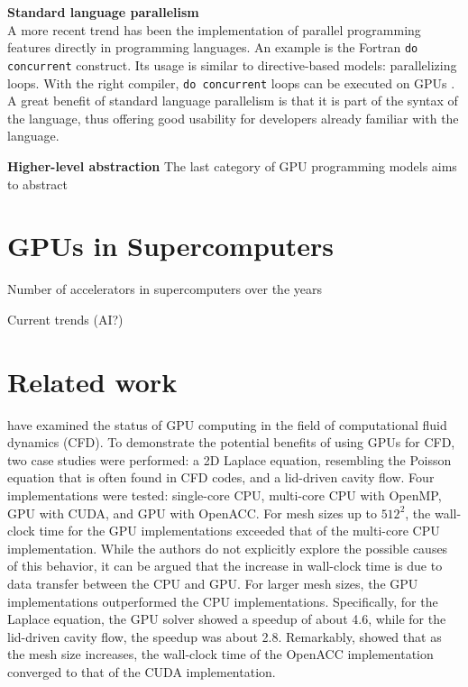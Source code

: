 \textbf{Standard language parallelism} \\
A more recent trend has been the implementation of parallel programming features directly in programming languages. An example is the Fortran \texttt{do concurrent} construct. Its usage is similar to directive-based models: parallelizing loops. With the right compiler, \texttt{do concurrent} loops can be executed on GPUs \citep{kedwardStateFortran2022}. A great benefit of standard language parallelism is that it is part of the syntax of the language, thus offering good usability for developers already familiar with the language. 

\textbf{Higher-level abstraction}
The last category of GPU programming models aims to abstract 

\section{GPUs in Supercomputers}

Number of accelerators in supercomputers over the years

Current trends (AI?)

\section{Related work}
\citet{niemeyerRecentProgressChallenges2014} have examined the status of GPU computing in the field of computational fluid dynamics (CFD). To demonstrate the potential benefits of using GPUs for CFD, two case studies were performed: a 2D Laplace equation, resembling the Poisson equation that is often found in CFD codes, and a lid-driven cavity flow. Four implementations were tested: single-core CPU, multi-core CPU with OpenMP, GPU with CUDA, and GPU with OpenACC. For mesh sizes up to $512^2$, the wall-clock time for the GPU implementations exceeded that of the multi-core CPU implementation. While the authors do not explicitly explore the possible causes of this behavior, it can be argued that the increase in wall-clock time is due to data transfer between the CPU and GPU. For larger mesh sizes, the GPU implementations outperformed the CPU implementations. Specifically, for the Laplace equation, the GPU solver showed a speedup of about 4.6, while for the lid-driven cavity flow, the speedup was about 2.8. Remarkably, \citet{niemeyerRecentProgressChallenges2014} showed that as the mesh size increases, the wall-clock time of the OpenACC implementation converged to that of the CUDA implementation.


